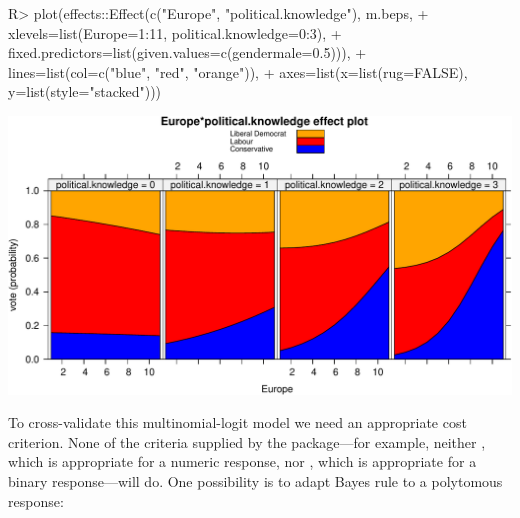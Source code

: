 \documentclass[
]{jss}
\begin{document}
\begin{CodeChunk}
\begin{CodeInput}
R> plot(effects::Effect(c("Europe", "political.knowledge"), m.beps,
+             xlevels=list(Europe=1:11, political.knowledge=0:3),
+             fixed.predictors=list(given.values=c(gendermale=0.5))),
+      lines=list(col=c("blue", "red", "orange")),
+      axes=list(x=list(rug=FALSE), y=list(style="stacked")))
\end{CodeInput}


\begin{center}\includegraphics{JSS-article_files/figure-latex/BEPS-plot-1} \end{center}

\end{CodeChunk}

To cross-validate this multinomial-logit model we need an appropriate
cost criterion. None of the criteria supplied by the 
package---for example, neither , which is appropriate for a
numeric response, nor , which is appropriate for a
binary response---will do. One possibility is to adapt Bayes rule to a
polytomous response:
\end{document}
